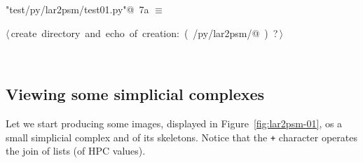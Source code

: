 \documentclass[11pt,oneside]{article}	%
\begin{document}
\begin{flushleft} \small
\begin{minipage}{\linewidth} \label{scrap18}
\protect{}\verb@"test/py/lar2psm/test01.py"@\nobreak\ {\footnotesize 7a }$\equiv$
\vspace{-1ex}
\begin{list}{}{} \item
\mbox{}\verb@@\hbox{$\langle\,$create directory and echo of creation:\nobreak\ ({\footnotesize {}\label{scrap19}
 }\mbox{}\verb@test/py/lar2psm/@ ) {\footnotesize ?}$\,\rangle$}\verb@@\\
\mbox{}\verb@@{\NWsep}
\end{list}
\vspace{-2ex}
\end{minipage}\\[4ex]
\end{flushleft}


\subsection{Viewing some simplicial complexes}
Let we start producing some images, displayed in Figure~\ref{fig:lar2psm-01}, os a small simplicial complex and of its skeletons. Notice that the \texttt{+} character operates the join of lists (of HPC values).
\end{document}
